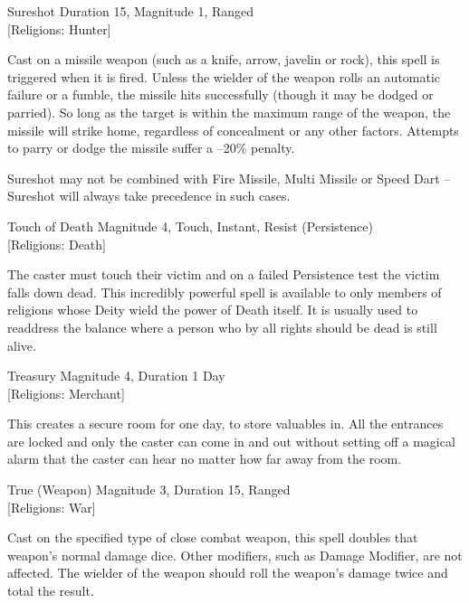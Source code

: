 \begin{rpg-spell}
{Sureshot}
{Duration 15, Magnitude 1, Ranged\\{[Religions: Hunter]}}

Cast on a missile weapon (such as a knife, arrow, javelin or rock), this spell is triggered when it is fired. Unless the wielder of the weapon rolls an automatic failure or a fumble, the missile hits successfully (though it may be dodged or parried). So long as the target is within the maximum range of the weapon, the missile will strike home, regardless of concealment or any other factors. Attempts to parry or dodge the missile suffer a –20\% penalty. 

Sureshot may not be combined with Fire Missile, Multi Missile or Speed Dart – Sureshot will always take precedence in such cases. 
\end{rpg-spell}

\begin{rpg-spell}
{Touch of Death}
{Magnitude 4, Touch, Instant, Resist (Persistence)\\{[Religions: Death]}}

The caster must touch their victim and on a failed Persistence test the victim falls down dead. This incredibly powerful spell is available to only members of religions whose Deity wield the power of Death itself. It is usually used to readdress the balance where a person who by all rights should be dead is still alive. 
\end{rpg-spell}

\begin{rpg-spell}
{Treasury}
{Magnitude 4, Duration 1 Day\\{[Religions: Merchant]}}

This creates a secure room for one day, to store valuables in. All the entrances are locked and only the caster can come in and out without setting off a magical alarm that the caster can hear no matter how far away from the room.
\end{rpg-spell}

\begin{rpg-spell}
{True (Weapon)}
{Magnitude 3, Duration 15, Ranged\\{[Religions: War]}}

Cast on the specified type of close combat weapon, this spell doubles that weapon’s normal damage dice. Other modifiers, such as Damage Modifier, are not affected. The wielder of the weapon should roll the weapon’s damage twice and total the result.
\end{rpg-spell}

